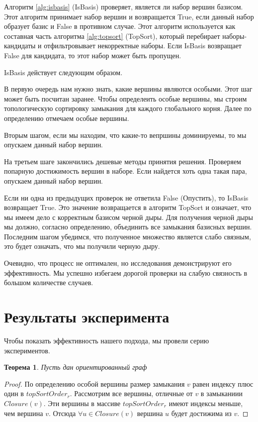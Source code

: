 \documentclass[12pt,a4paper,oneside]{article}
\newtheorem{theorem}{Теорема}
\theoremstyle{definition}
\theoremstyle{lemma}
\theoremstyle{remark}
\begin{document}
Алгоритм \ref{alg:isbasis} (IsBasis)  проверяет, является ли набор вершин базисом. Этот алгоритм принимает набор вершин и возвращается True, если данный набор образует базис и False в противном случае. Этот алгоритм используется как составная часть алгоритма \ref{alg:topsort} (TopSort), который перебирает наборы-кандидаты и отфильтровывает некорректные наборы. Если IsBasis возвращает False для кандидата, то этот набор может быть пропущен.

IsBasis действует следующим образом.

В первую очередь нам нужно знать, какие вершины являются особыми. Этот шаг может быть посчитан заранее. Чтобы определеить особые вершины, мы строим топологическую сортировку замыкания для каждого глобального корня. Далее по определению отмечаем особые вершины.

Вторым шагом, если мы находим, что какие-то вепршины доминируемы, то мы опускаем данный набор вершин.

На третьем шаге закончились дешевые методы принятия решения. Проверяем попарную достижимость вершин в наборе. Если найдется хоть одна такая пара, опускаем данный набор вершин.

Если ни одна из предыдущих проверок не ответила False (Опустить), то IsBasis возвращает True. Это значение возвращается в алгоритм TopSort и означает, что мы имеем дело с корректным базисом черной дыры. Для получения черной дыры мы должно, согласно определению, объединить все замыкания базисных вершин. Последним шагом убедимся, что полученное множество является слабо связным, это будет означать, что мы получили черную дыру.

Очевидно, что процесс не оптимален, но исследования демонстрируют его эффективность. Мы успешно избегаем дорогой проверки на слабую связность в большом количестве случаев.

\section{Результаты эксперимента}\label{sec:experimentalresults}

Чтобы показать эффективность нашего подхода, мы провели серию экспериментов.


\begin{theorem}
Пусть дан ориентированный граф
\end{theorem}
\begin{proof}
По определению особой вершины размер замыкания $v$ равен индексу плюс один в $topSortOrder_r$. Рассмотрим все вершины, отличные от $v$ в замыканиии $Closure(v)$. Эти вершины в массиве $topSortOrder_r$ имеют индексы меньше, чем вершина $v$. Отсюда $\forall u \in Closure(v)$ вершина $u$ будет достижима из $v$.
\end{proof}
\end{document}
